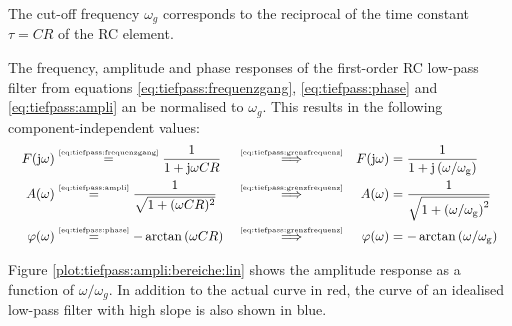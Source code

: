 \begin{frame}
{    The cut-off frequency $\omega_g$ corresponds to the reciprocal of the time constant $\tau = CR$ of the RC element.
    
    The frequency, amplitude and phase responses of the first-order RC low-pass filter from equations 
    \ref{eq:tiefpass:frequenzgang}, \ref{eq:tiefpass:phase} and \ref{eq:tiefpass:ampli}
    an be normalised to $\omega_g$. This results in the following component-independent values:
    \begin{align}
        &&F(\mathrm{j}\omega) &\overset{\text{\tiny{\ref{eq:tiefpass:frequenzgang}}}}{=} \frac{1}{1+\mathrm{j}\omega CR} &  
            &\overset{\text{\tiny{\ref{eq:tiefpass:grenzfrequenz}}}}{\Longrightarrow}&
            F(\mathrm{j}\omega) &= \frac{1}{1+\mathrm{j}\left(\omega/\omega_{\mathrm{g}}\right)} &&\label{eq:tiefpass:normiert:frequenzgang}\\
        &&A(\omega) &\overset{\text{\tiny{\ref{eq:tiefpass:ampli}}}}{=} \frac{1}{\sqrt{1 + (\omega CR)^2 }} & 
            &\overset{\text{\tiny{\ref{eq:tiefpass:grenzfrequenz}}}}{\Longrightarrow}&
            A(\omega) &= \frac{1}{\sqrt{1 + \left(\omega/\omega_{\mathrm{g}}\right)^2 }} \label{eq:tiefpass:normiert:amplitudengang}\\
        &&\varphi(\omega) &\overset{\text{\tiny{\ref{eq:tiefpass:phase}}}}{=} -\arctan\left(\omega CR\right) &  
            &\overset{\text{\tiny{\ref{eq:tiefpass:grenzfrequenz}}}}{\Longrightarrow}&
            \varphi(\omega) &= -\arctan\left(\omega/\omega_{\mathrm{g}}\right) \label{eq:tiefpass:normiert:phasengang}
    \end{align}

\renewcommand{\figurename}{Figure}

    Figure \ref{plot:tiefpass:ampli:bereiche:lin} shows the amplitude response as a function of $\omega/\omega_g$.
    In addition to the actual curve in red, the curve of an idealised low-pass filter with high slope is also shown in blue.

}
\end{frame}
